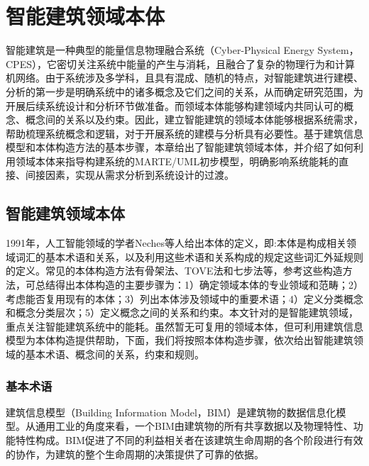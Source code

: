 \chapter{智能建筑领域本体}
\label{ch2}
	智能建筑是一种典型的能量信息物理融合系统（Cyber-Physical Energy System，CPES），它密切关注系统中能量的产生与消耗，且融合了复杂的物理行为和计算机网络。由于系统涉及多学科，且具有混成、随机的特点，对智能建筑进行建模、分析的第一步是明确系统中的诸多概念及它们之间的关系，从而确定研究范围，为开展后续系统设计和分析环节做准备。而领域本体能够构建领域内共同认可的概念、概念间的关系以及约束。因此，建立智能建筑的领域本体能够根据系统需求，帮助梳理系统概念和逻辑，对于开展系统的建模与分析具有必要性。基于建筑信息模型和本体构造方法的基本步骤，本章给出了智能建筑领域本体，并介绍了如何利用领域本体来指导构建系统的MARTE/UML初步模型，明确影响系统能耗的直接、间接因素，实现从需求分析到系统设计的过渡。
	
\section{智能建筑领域本体}
	1991年，人工智能领域的学者Neches等人给出本体的定义，即:本体是构成相关领域词汇的基本术语和关系，以及利用这些术语和关系构成的规定这些词汇外延规则的定义\citep{王乐2008基于本体的垂直搜索引擎研究,DBLP:journals/aim/NechesFFGPSS91}。常见的本体构造方法有骨架法、TOVE法和七步法\citep{张文秀2011领域本体的构建方法研究}等，参考这些构造方法，可总结得出本体构造的主要步骤为：1）确定领域本体的专业领域和范畴；2）考虑能否复用现有的本体；3）列出本体涉及领域中的重要术语；4）定义分类概念和概念分类层次；5）定义概念之间的关系和约束。本文针对的是智能建筑领域，重点关注智能建筑系统中的能耗。虽然暂无可复用的领域本体，但可利用建筑信息模型为本体构造提供帮助，下面，我们将按照本体构造步骤，依次给出智能建筑领域的基本术语、概念间的关系，约束和规则。
	
\subsection{基本术语}
	建筑信息模型（Building Information Model，BIM）\citep{DBLP:conf/wsc/OckIF16}是建筑物的数据信息化模型。从通用工业的角度来看，一个BIM由建筑物的所有共享数据以及物理特性、功能特性构成。BIM促进了不同的利益相关者在该建筑生命周期的各个阶段进行有效的协作，为建筑的整个生命周期的决策提供了可靠的依据\citep{张文秀2011领域本体的构建方法研究}。
	
